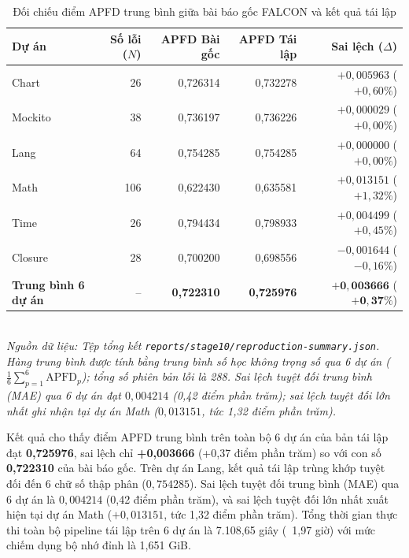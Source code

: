\begin{table}[H]
\centering
\caption{Đối chiếu điểm APFD trung bình giữa bài báo gốc FALCON và kết quả tái lập}
\label{tab:reproduction_comparison}
\small
\begin{tabular}{lrrrr}
\toprule
\textbf{Dự án} & \textbf{Số lỗi ($N$)} & \textbf{APFD Bài gốc} & \textbf{APFD Tái lập} & \textbf{Sai lệch ($\Delta$)} \\
\midrule
Chart   & 26  & 0,726314 & 0,732278 & $+0,005963$ ($+0,60\%$) \\
Mockito & 38  & 0,736197 & 0,736226 & $+0,000029$ ($+0,00\%$) \\
Lang    & 64  & 0,754285 & 0,754285 & $+0,000000$ ($+0,00\%$) \\
Math    & 106 & 0,622430 & 0,635581 & $+0,013151$ ($+1,32\%$) \\
Time    & 26  & 0,794434 & 0,798933 & $+0,004499$ ($+0,45\%$) \\
Closure & 28  & 0,700200 & 0,698556 & $-0,001644$ ($-0,16\%$) \\
\midrule
\textbf{Trung bình 6 dự án} & -- & \textbf{0,722310} & \textbf{0,725976} & $\mathbf{+0,003666}$ ($\mathbf{+0,37\%}$) \\
\bottomrule
\end{tabular}
\vspace{1mm}\\
\footnotesize{\textit{Nguồn dữ liệu: Tệp tổng kết \texttt{reports/stage10/reproduction-summary.json}. Hàng trung bình được tính bằng trung bình số học không trọng số qua 6 dự án ($\frac{1}{6}\sum_{p=1}^6 \text{APFD}_p$); tổng số phiên bản lỗi là 288. Sai lệch tuyệt đối trung bình (MAE) qua 6 dự án đạt $0,004214$ (0,42 điểm phần trăm); sai lệch tuyệt đối lớn nhất ghi nhận tại dự án Math ($0,013151$, tức 1,32 điểm phần trăm).}}
\end{table}

Kết quả cho thấy điểm APFD trung bình trên toàn bộ 6 dự án của bản tái lập đạt \textbf{0,725976}, sai lệch chỉ \textbf{+0,003666} (+0,37 điểm phần trăm) so với con số \textbf{0,722310} của bài báo gốc. Trên dự án Lang, kết quả tái lập trùng khớp tuyệt đối đến 6 chữ số thập phân ($0,754285$). Sai lệch tuyệt đối trung bình (MAE) qua 6 dự án là $0,004214$ (0,42 điểm phần trăm), và sai lệch tuyệt đối lớn nhất xuất hiện tại dự án Math ($+0,013151$, tức 1,32 điểm phần trăm).
Tổng thời gian thực thi toàn bộ pipeline tái lập trên 6 dự án là 7.108,65 giây (~1,97 giờ) với mức chiếm dụng bộ nhớ đỉnh là 1,651 GiB.

